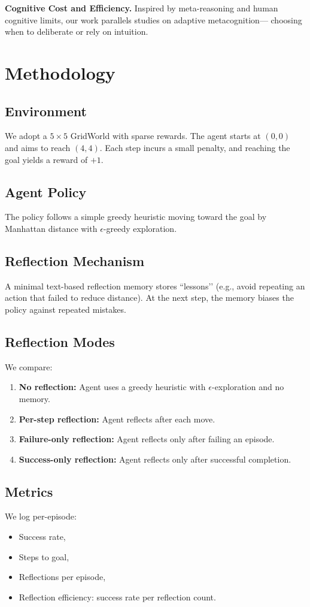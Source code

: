 \documentclass[conference]{IEEEtran}
\begin{document}
\textbf{Cognitive Cost and Efficiency.}
Inspired by meta-reasoning and human cognitive limits,
our work parallels studies on adaptive metacognition---
choosing when to deliberate or rely on intuition.

\section{Methodology}
\subsection{Environment}
We adopt a $5\times5$ GridWorld with sparse rewards.
The agent starts at $(0,0)$ and aims to reach $(4,4)$.
Each step incurs a small penalty, and reaching the goal yields a reward of $+1$.

\subsection{Agent Policy}
The policy follows a simple greedy heuristic
moving toward the goal by Manhattan distance with $\epsilon$-greedy exploration.

\subsection{Reflection Mechanism}
A minimal text-based reflection memory stores ``lessons’’
(e.g., avoid repeating an action that failed to reduce distance).
At the next step, the memory biases the policy against repeated mistakes.

\subsection{Reflection Modes}
We compare:
\begin{enumerate}
  \item \textbf{No reflection:} Agent uses a greedy heuristic with $\epsilon$-exploration and no memory.  \item \textbf{Per-step reflection:} Agent reflects after each move.
  \item \textbf{Failure-only reflection:} Agent reflects only after failing an episode.
  \item \textbf{Success-only reflection:} Agent reflects only after successful completion.
\end{enumerate}

\subsection{Metrics}
We log per-episode:
\begin{itemize}
  \item Success rate,
  \item Steps to goal,
  \item Reflections per episode,
  \item Reflection efficiency: success rate per reflection count.
\end{itemize}
\end{document}

